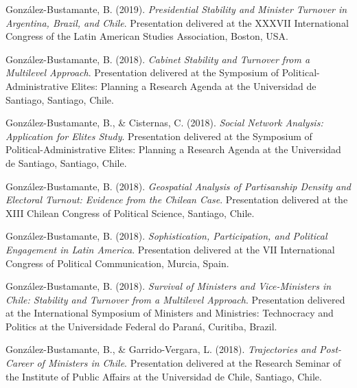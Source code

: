 \begin{publications}
\begin{benumerate}{71}
\item{\small González-Bustamante, B. (2019). {\itshape Presidential Stability and Minister Turnover in Argentina, Brazil, and Chile}. Presentation delivered at the XXXVII International Congress of the Latin American Studies Association, Boston, USA.}\vspace{1mm}

\item{\small González-Bustamante, B. (2018). {\itshape Cabinet Stability and Turnover from a Multilevel Approach}. Presentation delivered at the Symposium of Political-Administrative Elites: Planning a Research Agenda at the Universidad de Santiago, Santiago, Chile.}\vspace{1mm}

\item{\small González-Bustamante, B., \& Cisternas, C. (2018). {\itshape Social Network Analysis: Application for Elites Study}. Presentation delivered at the Symposium of Political-Administrative Elites: Planning a Research Agenda at the Universidad de Santiago, Santiago, Chile.}\vspace{1mm}

\item{\small González-Bustamante, B. (2018). {\itshape Geospatial Analysis of Partisanship Density and Electoral Turnout: Evidence from the Chilean Case}. Presentation delivered at the XIII Chilean Congress of Political Science, Santiago, Chile.}\vspace{1mm}

\item{\small González-Bustamante, B. (2018). {\itshape Sophistication, Participation, and Political Engagement in Latin America}. Presentation delivered at the VII International Congress of Political Communication, Murcia, Spain.}\vspace{1mm}

\item{\small González-Bustamante, B. (2018). {\itshape Survival of Ministers and Vice-Ministers in Chile: Stability and Turnover from a Multilevel Approach}. Presentation delivered at the International Symposium of Ministers and Ministries: Technocracy and Politics at the Universidade Federal do Paraná, Curitiba, Brazil.}\vspace{1mm}

\item{\small González-Bustamante, B., \& Garrido-Vergara, L. (2018). {\itshape Trajectories and Post-Career of Ministers in Chile}. Presentation delivered at the Research Seminar of the Institute of Public Affairs at the Universidad de Chile, Santiago, Chile.}\vspace{1mm}


\end{benumerate}
\end{publications}
